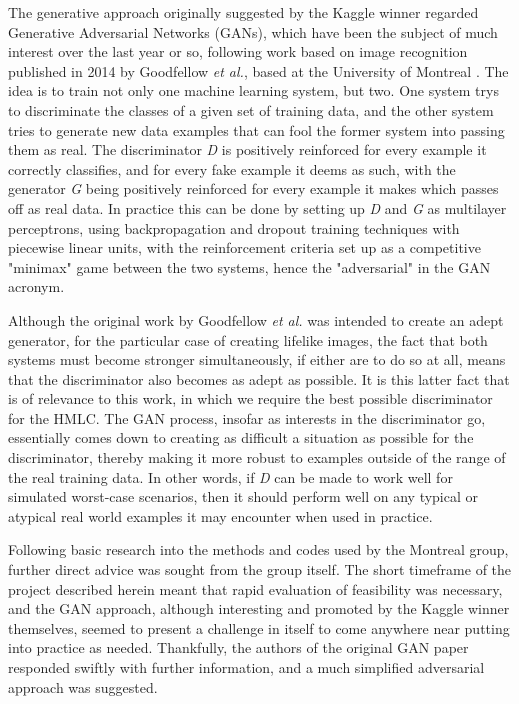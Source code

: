 \documentclass{article} %
\begin{document}
The generative approach originally suggested by the Kaggle winner regarded Generative Adversarial Networks (GANs), which have been the subject of much interest over the last year or so, following work based on image recognition published in 2014 by Goodfellow \textit{et al.}, based at the University of Montreal \cite{Goodfellow2014}. The idea is to train not only one machine learning system, but two. One system trys to discriminate the classes of a given set of training data, and the other system tries to generate new data examples that can fool the former system into passing them as real. The discriminator \textit{D} is positively reinforced for every example it correctly classifies, and for every fake example it deems as such, with the generator \textit{G} being positively reinforced for every example it makes which passes off as real data. In practice this can be done by setting up \textit{D} and \textit{G} as multilayer perceptrons, using backpropagation and dropout training techniques with piecewise linear units, with the reinforcement criteria set up as a competitive "minimax" game between the two systems, hence the "adversarial" in the GAN acronym.

Although the original work by Goodfellow \textit{et al.} was intended to create an adept generator, for the particular case of creating lifelike images, the fact that both systems must become stronger simultaneously, if either are to do so at all, means that the discriminator also becomes as adept as possible. It is this latter fact that is of relevance to this work, in which we require the best possible discriminator for the HMLC. The GAN process, insofar as interests in the discriminator go, essentially comes down to creating as difficult a situation as possible for the discriminator, thereby making it more robust to examples outside of the range of the real training data. In other words, if \textit{D} can be made to work well for simulated worst-case scenarios, then it should perform well on any typical or atypical real world examples it may encounter when used in practice.

Following basic research into the methods and codes used by the Montreal group, further direct advice was sought from the group itself. The short timeframe of the project described herein meant that rapid evaluation of feasibility was necessary, and the GAN approach, although interesting and promoted by the Kaggle winner themselves, seemed to present a challenge in itself to come anywhere near putting into practice as needed. Thankfully, the authors of the original GAN paper responded swiftly with further information, and a much simplified adversarial approach was suggested.
\end{document}
